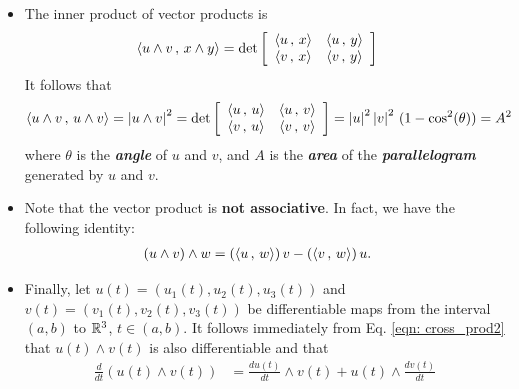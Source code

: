 \documentclass[11pt]{article}
\begin{document}
\begin{itemize}
\item The inner product of vector products is 
\begin{align*}
\left\langle u\wedge v\,,\, x \wedge y \right\rangle &= \det\left[\begin{array}{cc}
\left\langle u\,,\, x \right\rangle & \left\langle u\,,\, y \right\rangle  \\ 
\left\langle v\,,\, x \right\rangle & \left\langle v\,,\, y \right\rangle 
\end{array} \right]
\end{align*}
It follows that 
\begin{align*}
\left\langle u\wedge v\,,\, u \wedge v \right\rangle = \left\lvert u \wedge v \right\rvert^2  &= \det\left[\begin{array}{cc}
\left\langle u\,,\, u \right\rangle & \left\langle u\,,\, v \right\rangle  \\ 
\left\langle v\,,\, u \right\rangle & \left\langle v\,,\, v \right\rangle 
\end{array} \right] = \left\lvert u \right\rvert^2\left\lvert v \right\rvert^2\,(1- \cos^2(\theta)) = A^2
\end{align*} where $\theta$ is the \emph{\textbf{angle}} of $u$ and $v$, and $A$ is the \emph{\textbf{area}} of the \emph{\textbf{parallelogram}} generated by $u$ and $v$.

\item Note that the vector product is \textbf{not associative}. In fact, we have the following identity:
\begin{align}
(u \wedge v) \wedge w &= (\left\langle u\,,\, w \right\rangle)\,v - (\left\langle v\,,\, w \right\rangle)\,u. \label{eqn: cross_prod_cros_prod_again}
\end{align}

\item Finally, let $u(t) = (u_1(t), u_2(t), u_3(t))$ and $v(t) = (v_1(t), v_2(t), v_3(t))$ be differentiable maps from the interval $(a, b)$ to ${\mathbb R}^3$, $t \in (a, b)$. It follows immediately from Eq. \eqref{eqn: cross_prod2} that $u(t) \wedge v(t)$ is also differentiable and that
\begin{align*}
\frac{d}{dt}(u(t) \wedge v(t)) &= \frac{d u(t)}{dt} \wedge v(t) + u(t) \wedge \frac{d v(t)}{dt}
\end{align*}

\end{itemize}
\end{document}
